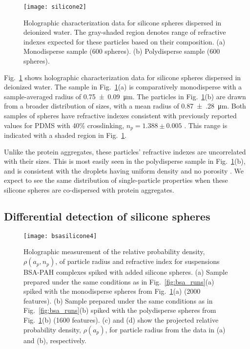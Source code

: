 \begin{figure}[!t]
  \centering
  \texttt{[image: silicone2]}
	\caption[Holographic characterization for silicone spheres]
    {Holographic characterization data for silicone spheres dispersed in deionized water. 
    The gray-shaded region denotes range of refractive indexes expected for these 
    particles based on their composition. (a) Monodisperse sample (600 spheres). (b) 
    Polydisperse sample (600 spheres).}
	\label{fig:silicone}
\end{figure}

Fig.~\ref{fig:silicone} shows holographic characterization data for silicone spheres 
dispersed in deionized water. The sample in Fig.~\ref{fig:silicone}(a) is comparatively 
monodisperse with a sample-averaged radius of \SI{0.75(9)}{\um}. The particles in 
Fig.~\ref{fig:silicone}(b) are drawn from a broader distribution of sizes, with a mean 
radius of \SI{0.87(28)}{\um}. Both samples of spheres have refractive indexes consistent 
with previously reported values for PDMS with 40\% crosslinking, $n_p = 1.388 \pm 0.005$ 
\cite{wang15}. This range is indicated with a shaded region in Fig.~\ref{fig:silicone}.

Unlike the protein aggregates, these particles’ refractive indexes are uncorrelated with 
their sizes. This is most easily seen in the polydisperse sample in 
Fig.~\ref{fig:silicone}(b), and is consistent with the droplets having uniform density 
and no porosity \cite{wang15}. We expect to see the same distribution of single-particle 
properties when these silicone spheres are co-dispersed with protein aggregates.

\subsection{Differential detection of silicone spheres}

\begin{figure}[!t]
  \centering
  \texttt{[image: bsasilicone4]}
	\caption[Holographic measurement for BSA-PAH complexes with added silicone spheres]
    {Holographic measurement of the relative probability density, $\rho(a_p,n_p)$, of 
    particle radius and refractive index for suspensions BSA-PAH complexes spiked with 
    added silicone spheres. (a) Sample prepared under the same conditions as in 
    Fig.~\ref{fig:bsa_runs}(a) spiked with the monodisperse spheres from 
    Fig.~\ref{fig:silicone}(a) (2000 features). (b) Sample prepared under the same 
    conditions as in Fig.~\ref{fig:bsa_runs}(b) spiked with the polydisperse spheres from 
    Fig.~\ref{fig:silicone}(b) (1600 features). (c) and (d) show the projected relative 
    probability density, $\rho(a_p)$, for particle radius from the data in (a) and (b), 
    respectively.}
	\label{fig:bsasilicone}
\end{figure}

